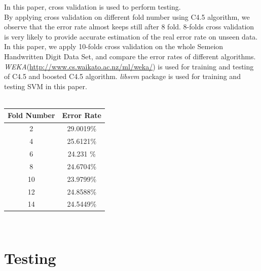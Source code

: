 \documentclass[a4paper,11pt]{article}
\begin{document}
In this paper, cross validation is used to perform testing. \\
By applying cross validation on different fold number using C4.5 algorithm, we observe that the error rate almost keeps still after 8 fold. 8-folds cross validation is very likely to provide accurate estimation of the real error rate on unseen data. In this paper, we apply 10-folds cross validation on the whole Semeion Handwritten Digit Data Set, and compare the error rates of different algorithms.\\
\emph{WEKA}(\url{http://www.cs.waikato.ac.nz/ml/weka/}) is used for training and testing of C4.5 and boosted C4.5 algorithm. \emph{libsvm} package\cite{LIBSVM} is used for training and testing SVM in this paper.\\
\vspace{0.5cm}\\
\begin{tabular}{c c}
Fold Number & Error Rate\\
\hline \hline
2  &29.0019\%\\
4  &25.6121\%\\
6  &24.231 \%\\
8  & 24.6704\%\\
10 & 23.9799\%\\
12 & 24.8588\%\\
14 & 24.5449\%\\
\end{tabular}
\vspace{0.5cm}\\
\section{Testing}
\end{document}
